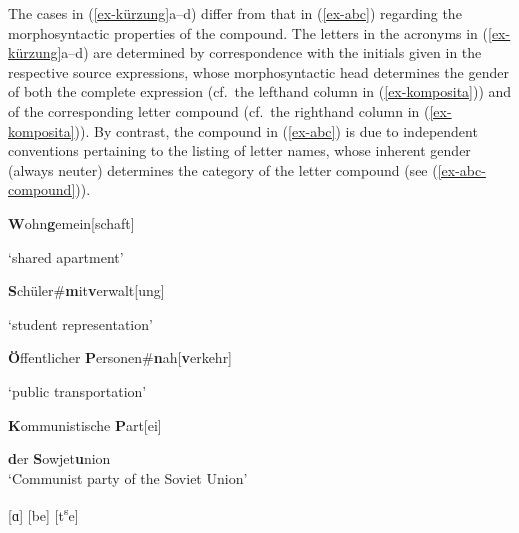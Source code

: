 \documentclass[output=paper
 ,nobabel
 ,draftmode
 ,colorlinks, citecolor=brown
]{langscibook}
\begin{document}
\largerpage
\noindent
The cases in (\ref{ex-kürzung}a--d)
differ from that in (\ref{ex-abc}) regarding the morphosyntactic properties of the compound. 
The letters in the acronyms in (\ref{ex-kürzung}a--d) are determined by correspondence with the initials given in the respective source expressions, whose morphosyntactic head determines the gender of both the complete expression (cf.\ the lefthand column in (\ref{ex-komposita})) and of the corresponding letter compound (cf.\ the righthand column in (\ref{ex-komposita})). By contrast, the compound in (\ref{ex-abc}) is due to independent conventions pertaining to the listing of letter names, whose inherent gender (always neuter) determines the category of the letter compound (see (\ref{ex-abc-compound})).

\settowidth\jamwidth{[[ɑ]\sub{\textsc{n.neut}}[be]\sub{\textsc{n.neut}}[tse]}
\eal\label{ex-komposita}
\ex\label{ex-wohngemeinschaft}
\textbf{W}ohn\textbf{g}emein[schaft]
\jambox{WG]\sub{\textsc{n.fem}} }

`shared apartment'

\ex
\textbf{S}chüler\#\textbf{m}it\textbf{v}erwalt[ung]
\jambox{SMV]\sub{\textsc{n.fem}} }

`student representation'

\ex
\textbf{Ö}ffentlicher \textbf{P}ersonen\#\textbf{n}ah[\textbf{v}erkehr]
\jambox{ÖPNV]\sub{\textsc{n.masc}} }

`public transportation'


\ex\label{ex-kpd}
\textbf{K}ommunistische \textbf{P}art[ei]
\jambox{KPdSU]\sub{\textsc{n.fem}} }

\textbf{d}er \textbf{S}owjet\textbf{u}nion\\
`Communist party of the Soviet Union'

\ex\label{ex-abc-compound}
{}[ɑ] [be] [t\textsuperscript{s}e]
\jambox{ABC]\sub{\textsc{n.neut}} }

\zl
\end{document}
